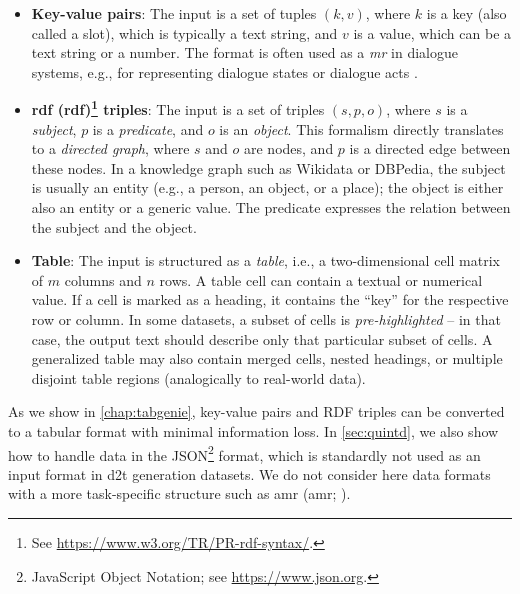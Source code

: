 {\begin{itemize}
    \item \textbf{Key-value pairs}: The input is a set of tuples $(k, v)$, where $k$ is a key (also called a slot), which is typically a text string, and $v$ is a value, which can be a text string or a number. The format is often used as a \emph{\ac{mr}} in dialogue systems, e.g., for representing dialogue states or dialogue acts \cite{rastogiScalableMultiDomainConversational2020,budzianowskiMultiWOZLargeScaleMultiDomain2020}.
    \item \textbf{\acs{rdf} (\Acl{rdf})\footnote{See \url{https://www.w3.org/TR/PR-rdf-syntax/}.} triples}: The input is a set of triples $(s, p, o)$, where $s$ is a \emph{subject},  $p$ is a \emph{predicate}, and $o$ is an \textit{object}. This formalism directly translates to a \emph{directed graph}, where $s$ and $o$ are nodes, and $p$ is a directed edge between these nodes. In a knowledge graph such as Wikidata or DBPedia, the subject is usually an entity (e.g., a person, an object, or a place); the object is either also an entity or a generic value. The predicate expresses the relation between the subject and the object.
    \item \textbf{Table}: The input is structured as a \textit{table}, i.e., a two-dimensional cell matrix of $m$ columns and $n$ rows. A table cell can contain a textual or numerical value. If a cell is marked as a heading, it contains the ``key'' for the respective row or column. In some datasets, a subset of cells is \emph{pre-highlighted} -- in that case, the output text should describe only that particular subset of cells. A generalized table may also contain merged cells, nested headings, or multiple disjoint table regions (analogically to real-world data).
\end{itemize}

As we show in \autoref{chap:tabgenie}, key-value pairs and RDF triples can be converted to a tabular format with minimal information loss. In \autoref{sec:quintd}, we also show how to handle data in the JSON\footnote{JavaScript Object Notation; see \url{https://www.json.org}.} format, which is standardly not used as an input format in \ac{d2t} generation datasets. We do not consider here data formats with a more task-specific structure such as \acl{amr} (\acs{amr}; \citealp{banarescu2013abstract}).

}
